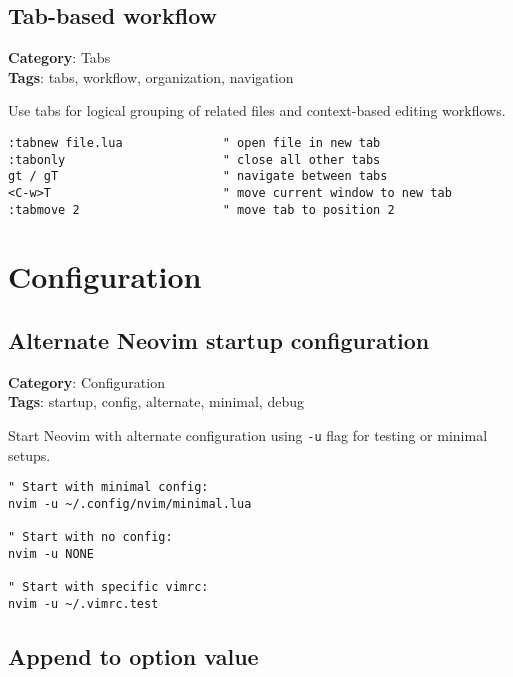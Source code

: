 {{{\section{Tab-based workflow}

\textbf{Category}: Tabs\\ \textbf{Tags}: tabs, workflow, organization, navigation
\vspace{0.5cm}

Use tabs for logical grouping of related files and context-based editing workflows.

\begin{Exa*}{}
\begin{Verbatim}[fontsize=\footnotesize, breaklines, breakanywhere]
:tabnew file.lua              " open file in new tab
:tabonly                      " close all other tabs
gt / gT                       " navigate between tabs
<C-w>T                        " move current window to new tab
:tabmove 2                    " move tab to position 2
\end{Verbatim}
\end{Exa*}

\chapter{Configuration}
\section{Alternate Neovim startup configuration}

\textbf{Category}: Configuration\\ \textbf{Tags}: startup, config, alternate, minimal, debug
\vspace{0.5cm}

Start Neovim with alternate configuration using {\footnotesize \Verb§-u§} flag for testing or minimal setups.

\begin{Exa*}{}
\begin{Verbatim}[fontsize=\footnotesize, breaklines, breakanywhere]
" Start with minimal config:
nvim -u ~/.config/nvim/minimal.lua

" Start with no config:
nvim -u NONE

" Start with specific vimrc:
nvim -u ~/.vimrc.test
\end{Verbatim}
\end{Exa*}

\section{Append to option value}

}}}
